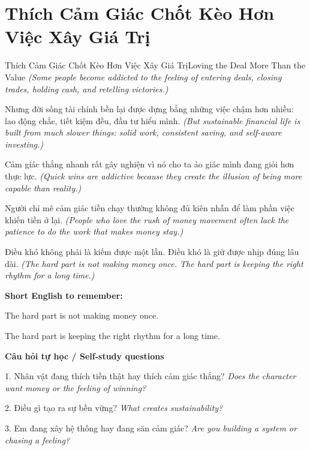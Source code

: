 \section{Thích Cảm Giác Chốt Kèo Hơn Việc Xây Giá Trị}
\begin{truyen}{Thích Cảm Giác Chốt Kèo Hơn Việc Xây Giá Trị}{Loving the Deal More Than the Value}
\textit{(Some people become addicted to the feeling of entering deals, closing trades, holding cash, and retelling victories.)}

Nhưng đời sống tài chính bền lại được dựng bằng những việc chậm hơn nhiều: lao động chắc, tiết kiệm đều, đầu tư hiểu mình.
\textit{(But sustainable financial life is built from much slower things: solid work, consistent saving, and self-aware investing.)}

Cảm giác thắng nhanh rất gây nghiện vì nó cho ta ảo giác mình đang giỏi hơn thực lực.
\textit{(Quick wins are addictive because they create the illusion of being more capable than reality.)}

Người chỉ mê cảm giác tiền chạy thường không đủ kiên nhẫn để làm phần việc khiến tiền ở lại.
\textit{(People who love the rush of money movement often lack the patience to do the work that makes money stay.)}

\end{truyen}

\begin{baihoc}
Điều khó không phải là kiếm được một lần. Điều khó là giữ được nhịp đúng lâu dài.
\textit{(The hard part is not making money once. The hard part is keeping the right rhythm for a long time.)}
\end{baihoc}

\begin{ghinhoanh}
\textbf{Short English to remember:}

The hard part is not making money once.

The hard part is keeping the right rhythm for a long time.

\end{ghinhoanh}

\begin{tuhocnhanh}
\textbf{Câu hỏi tự học / Self-study questions}

1. Nhân vật đang thích tiền thật hay thích cảm giác thắng? \textit{Does the character want money or the feeling of winning?}

2. Điều gì tạo ra sự bền vững? \textit{What creates sustainability?}

3. Em đang xây hệ thống hay đang săn cảm giác? \textit{Are you building a system or chasing a feeling?}
\end{tuhocnhanh}
\ngancach

